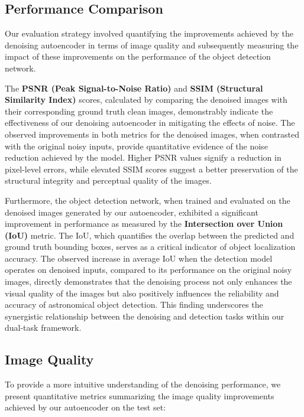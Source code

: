 \documentclass[12pt, conference]{IEEEtran}
\begin{document}
\subsection{Performance Comparison}
Our evaluation strategy involved quantifying the improvements achieved by the denoising autoencoder in terms of image quality and subsequently measuring the impact of these improvements on the performance of the object detection network.

The \textbf{PSNR (Peak Signal-to-Noise Ratio) }and \textbf{SSIM (Structural Similarity Index)} scores, calculated by comparing the denoised images with their corresponding ground truth clean images, demonstrably indicate the effectiveness of our denoising autoencoder in mitigating the effects of noise. The observed improvements in both metrics for the denoised images, when contrasted with the original noisy inputs, provide quantitative evidence of the noise reduction achieved by the model. Higher PSNR \cite{hore2010image} values signify a reduction in pixel-level errors, while elevated SSIM \cite{wang2004image} scores suggest a better preservation of the structural integrity and perceptual quality of the images.

Furthermore, the object detection network, when trained and evaluated on the denoised images generated by our autoencoder, exhibited a significant improvement in performance as measured by the \textbf{Intersection over Union (IoU)} metric. The IoU, which quantifies the overlap between the predicted and ground truth bounding boxes, serves as a critical indicator of object localization accuracy. The observed increase in average IoU when the detection model operates on denoised inputs, compared to its performance on the original noisy images, directly demonstrates that the denoising process not only enhances the visual quality of the images but also positively influences the reliability and accuracy of astronomical object detection. This finding underscores the synergistic relationship between the denoising and detection tasks within our dual-task framework. 

\subsection{Image Quality}
To provide a more intuitive understanding of the denoising performance, we present quantitative metrics summarizing the image quality improvements achieved by our autoencoder on the test set:
\end{document}
